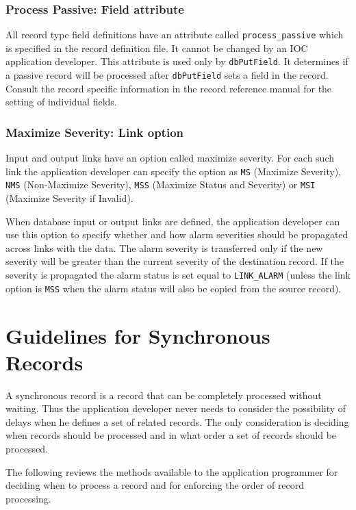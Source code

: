 \subsubsection{Process Passive: Field attribute}

All record type field definitions have an attribute called \verb|process_passive| which is specified in the record definition file.
It cannot be changed by an IOC application developer.
This attribute is used only by \verb|dbPutField|.
It determines if a passive record will be processed after \verb|dbPutField| sets a field in the record.
Consult the record specific information in the record reference manual for the setting of individual fields.

\subsubsection{Maximize Severity: Link option}

Input and output links have an option called maximize severity.
For each such link the application developer can specify the option as \verb|MS| (Maximize Severity), \verb|NMS| (Non-Maximize Severity), \verb|MSS| (Maximize Status and Severity) or \verb|MSI| (Maximize Severity if Invalid).

When database input or output links are defined, the application developer can use this option to specify whether and how alarm severities should be propagated across links with the data.
The alarm severity is transferred only if the new severity will be greater than the current severity of the destination record.
If the severity is propagated the alarm status is set equal to \verb|LINK_ALARM| (unless the link option is \verb|MSS| when the alarm status will also be copied from the source record).

\section{Guidelines for Synchronous Records}

A synchronous record is a record that can be completely processed without waiting.
Thus the application developer never needs to consider the possibility of delays when he defines a set of related records.
The only consideration is deciding when records should be processed and in what order a set of records should be processed.

The following reviews the methods available to the application programmer for deciding when to process a record and for 
enforcing the order of record processing.

